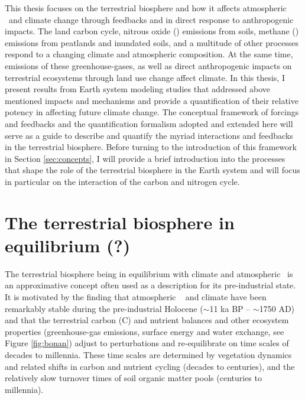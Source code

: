 This thesis focuses on the terrestrial biosphere and how it affects atmospheric \coo\ and climate change through feedbacks and in direct response to anthropogenic impacts. The land carbon cycle, nitrous oxide (\nno ) emissions from soils, methane (\chh ) emissions from peatlands and inundated soils, and a multitude of other processes \citep{arneth10ngeo} respond to a changing climate and atmospheric composition. At the same time, emissions of these greenhouse-gases, as well as direct anthropogenic impacts on terrestrial ecosystems through land use change affect climate. In this thesis, I present results from Earth system modeling studies that addressed above mentioned impacts and mechanisms and provide a quantification of their relative potency in affecting future climate change. The conceptual framework of forcings and feedbacks and the quantification formalism adopted and extended here will serve as a guide to describe and quantify the myriad interactions and feedbacks in the terrestrial biosphere. Before turning to the introduction of this framework in Section \ref{sec:concepts}, I will provide a brief introduction into the processes that shape the role of the terrestrial biosphere in the Earth system and will focus in particular on the interaction of the carbon and nitrogen cycle. 

\section{The terrestrial biosphere in equilibrium (?)}
The terrestrial biosphere being in equilibrium with climate and atmospheric \coo\ is an approximative concept often used as a description for its pre-industrial state. It is motivated by the finding that atmospheric \coo\ \citep{siegenthaler05, macfarling06grl} and climate have been remarkably stable during the pre-industrial Holocene ($\sim$11 ka BP -- $\sim$1750 AD) and that the terrestrial carbon (C) and nutrient balances and other ecosystem properties (greenhouse-gas emissions, surface energy and water exchange, see Figure \ref{fig:bonan}) adjust to perturbations and re-equilibrate on time scales of decades to millennia. These time scales are determined by vegetation dynamics and related shifts in carbon and nutrient cycling (decades to centuries), and the relatively slow turnover times of soil organic matter pools (centuries to millennia).
 
